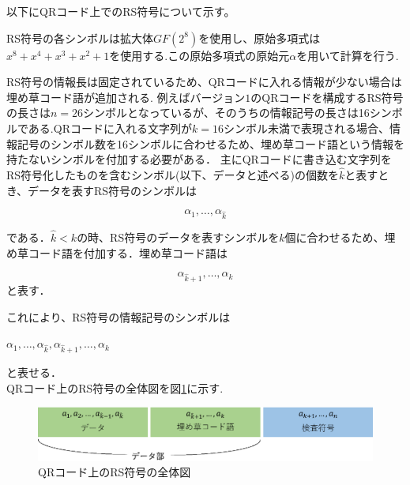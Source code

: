 \documentclass{thesis}
\begin{document}
以下にQRコード上でのRS符号について示す。

RS符号の各シンボルは拡大体$GF(2^8)$を使用し、原始多項式は
$x^{8}+x^{4}+x^{3}+x^{2}+1$を使用する.この原始多項式の原始元$\alpha$を用いて計算を行う.

RS符号の情報長は固定されているため、QRコードに入れる情報が少ない場合は埋め草コード語が追加される.
例えばバージョン$1$のQRコードを構成するRS符号の長さは$n=26$シンボルとなっているが、そのうちの情報記号の長さは16シンボルである.QRコードに入れる文字列が$k=16$シンボル未満で表現される場合、情報記号のシンボル数を16シンボルに合わせるため、埋め草コード語という情報を持たないシンボルを付加する必要がある．
主にQRコードに書き込む文字列をRS符号化したものを含むシンボル(以下、データと述べる)の個数を$\hat{k}$と表すとき、データを表すRS符号のシンボルは

\begin{equation}
\alpha_1,…,\alpha_{\hat{k}}
\label{eq:pol1}
\end{equation}

である．$\hat{k} < k$の時、RS符号のデータを表すシンボルを$k$個に合わせるため、埋め草コード語を付加する．埋め草コード語は
 
 \begin{equation}
 \alpha_{\hat{k} + 1},…,\alpha_{k}
\label{eq:pol3}
\end{equation}
と表す．


これにより、RS符号の情報記号のシンボルは

\begin{center}
$\alpha_1,…,\alpha_{\hat{k}},\alpha_{\hat{k}+1},…,\alpha_{k}$
\end{center}
と表せる．\\


QRコード上のRS符号の全体図を図\ref{RScode}に示す.

\begin{figure}[H]
 \centering
 \includegraphics[width=1\linewidth]{pic/RScode_Naoya.eps}
 \caption{QRコード上のRS符号の全体図\label{RScode}}
\end{figure}
\end{document}
